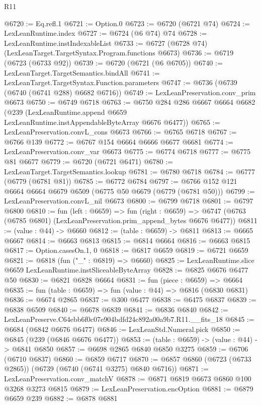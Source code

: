 \begin{lexlean}{R11}
\begin{coremodule}
@6720 := Eq.refl.{1}
@6721 := Option.{0}
@6723 := @6720 (@6721 @74)
@6724 := LexLeanRuntime.index
@6727 := @6724 (@6 @74) @74
@6728 := LexLeanRuntime.instIndexableList
@6733 := @6727 (@6728 @74) (LexLeanTarget.TargetSyntax.Program.functions @6673)
@6736 := @6719 (@6723 (@6733 @92))
@6739 := @6720 (@6721 (@6 @6705))
@6740 := LexLeanTarget.TargetSemantics.bindAll
@6741 := LexLeanTarget.TargetSyntax.Function.parameters
@6747 := @6736 (@6739 (@6740 (@6741 @288) @6682 @6716))
@6749 := LexLeanPreservation.conv_prim @6673
@6750 := @6749 @6718
@6763 := @6750
    @284
    @286
    @6667
    @6664
    @6682
    (@239 (LexLeanRuntime.append @6659 LexLeanRuntime.instAppendableByteArray @6676 @6477))
@6765 := LexLeanPreservation.convL_cons @6673
@6766 := @6765 @6718
@6767 := @6766 @139
@6772 := @6767 @154 @6664 @6666 @6677 @6681
@6774 := LexLeanPreservation.conv_var @6673
@6775 := @6774 @6718
@6777 := @6775 @81 @6677
@6779 := @6720 (@6721 @6471)
@6780 := LexLeanTarget.TargetSemantics.lookup
@6781 := @6780 @6718
@6784 := @6777 (@6779 (@6781 @81))
@6785 := @6772 @6784
@6797 := @6766 @152 @121 @6664 @6664 @6679 @6509 (@6775 @50 @6679 (@6779 (@6781 @50)))
@6799 := LexLeanPreservation.convL_nil @6673
@6800 := @6799 @6718
@6801 := @6797 @6800
@6810 := fun (left : @6659) =>
  fun (right : @6659) =>
  @6747 (@6763 (@6785 @6801) (LexLeanPreservation.prim_append_bytes @6676 @6477))
@6811 := (value : @44) -> @6660
@6812 := (table : @6659) -> @6811
@6813 := @6665 @6667
@6814 := @6663 @6813
@6815 := @6814 @6664
@6816 := @6663 @6815
@6817 := Option.casesOn.{1, 0}
@6818 := @6817 @6659
@6819 := @6721 @6659
@6821 := @6818 (fun ("_" : @6819) => @6660)
@6825 := LexLeanRuntime.slice @6659 LexLeanRuntime.instSliceableByteArray
@6828 := @6825 @6676 @6477 @50
@6830 := @6821 @6828 @6664
@6831 := fun (piece : @6659) => @6664
@6835 := fun (table : @6659) => fun (value : @44) => @6816 (@6830 @6831)
@6836 := @6674 @2865
@6837 := @300 @6477
@6838 := @6475 @6837
@6839 := @6838 @6509
@6840 := @6678 @6839
@6841 := @6836 @6840
@6842 := LexLeanPreserve.C64ebb6f0c07e904bdfd24c892a00a9b7.R11.__fits_18
@6845 := @6684 (@6842 @6676 @6477)
@6846 := LexLeanStd.Numeral.pick
@6850 := @6845 (@239 (@6846 @6676 @6477))
@6853 := (table : @6659) -> (value : @44) -> @6841 @6850
@6857 := @6698 @2865 @6840 @6850 @3275
@6859 := @6706 (@6710 @6837)
@6860 := @6859 @6717
@6870 := @6857 @6860 (@6723 (@6733 @2865)) (@6739 (@6740 (@6741 @3275) @6840 @6716))
@6871 := LexLeanPreservation.conv_matchV
@6878 := @6871 @6819 @6673 @6860 @100 @3268 @3273 @6815
@6879 := LexLeanPreservation.encOption
@6881 := @6879 @6659 @239
@6882 := @6878 @6881

\end{coremodule}
\end{lexlean}
